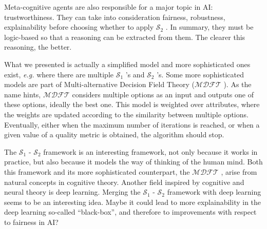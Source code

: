 \documentclass{article}
\newcommand{\so}{\ensuremath{\mathcal{S}_1} }
\newcommand{\st}{\ensuremath{\mathcal{S}_2} }
\newcommand{\mdft}{\ensuremath{\mathcal{MDFT}} }
\begin{document}
Meta-cognitive agents are also responsible for a major topic in AI: trustworthiness. They can take into consideration fairness, robustness, explainability before choosing whether to apply \st. In summary, they must be logic-based so that a reasoning can be extracted from them. The clearer this reasoning, the better.

What we presented is actually a simplified model and more sophisticated ones exist, \textit{e.g.} where there are multiple \so's and \st's. Some more sophisticated models are part of Multi-alternative Decision Field Theory (\mdft). As the name hints, \mdft considers multiple options as an input and outputs one of these options, ideally the best one. This model is weighted over attributes, where the weights are updated according to the similarity between multiple options. Eventually, either when the maximum number of iterations is reached, or when a given value of a quality metric is obtained, the algorithm should stop.

The \so- \st framework is an interesting framework, not only because it works in practice, but also because it models the way of thinking of the human mind. Both this framework and its more sophisticated counterpart, the \mdft, arise from natural concepts in cognitive theory. Another field inspired by cognitive and neural theory is deep learning. Merging the \so- \st framework with deep learning seems to be an interesting idea. Maybe it could lead to more explainability in the deep learning so-called ``black-box'', and therefore to improvements with respect to fairness in AI?
\end{document}
